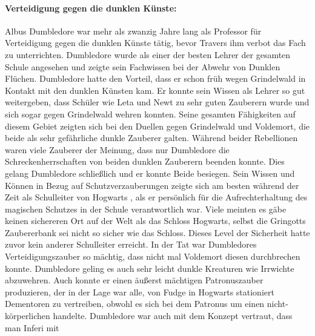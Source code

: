 \documentclass[a4paper, 10pt]{article}
\begin{document}
\paragraph{Verteidigung gegen die dunklen Künste:}
Albus Dumbledore war mehr als zwanzig Jahre lang als Professor für Verteidigung gegen die dunklen Künste tätig, bevor Travers ihm verbot das Fach zu unterrichten. Dumbledore wurde als einer der besten Lehrer der gesamten Schule angesehen und zeigte sein Fachwissen bei der Abwehr von Dunklen Flüchen. Dumbledore hatte den Vorteil, dass er schon früh wegen Grindelwald in Kontakt mit den dunklen Künsten kam. Er konnte sein Wissen als Lehrer so gut weitergeben, dass Schüler wie Leta und Newt zu sehr guten Zauberern wurde und sich sogar gegen Grindelwald wehren konnten. Seine gesamten Fähigkeiten auf diesem Gebiet zeigten sich bei den Duellen gegen Grindelwald und Voldemort, die beide als sehr gefährliche dunkle Zauberer galten. Während beider Rebellionen waren viele Zauberer der Meinung, dass nur Dumbledore die Schreckenherrschaften von beiden dunklen Zauberern beenden konnte. Dies gelang Dumbledore schließlich und er konnte Beide besiegen. Sein Wissen und Können in Bezug auf Schutzverzauberungen zeigte sich am besten während der Zeit als Schulleiter von Hogwarts , als er persönlich für die Aufrechterhaltung des magischen Schutzes in der Schule verantwortlich war. Viele meinten es gäbe keinen sichereren Ort auf der Welt als das Schloss Hogwarts, selbst die Gringotts Zaubererbank sei nicht so sicher wie das Schloss. Dieses Level der Sicherheit hatte zuvor kein anderer Schulleiter erreicht. In der Tat war Dumbledores Verteidigungszauber so mächtig, dass nicht mal Voldemort diesen durchbrechen konnte. Dumbledore geling es auch sehr leicht dunkle Kreaturen wie Irrwichte abzuwehren. Auch konnte er einen äußerst mächtigen Patronuszauber produzieren, der in der Lage war alle, von Fudge in Hogwarts stationiert Dementoren zu vertreiben, obwohl es sich bei dem Patronus um einen nicht-körperlichen handelte. Dumbledore war auch mit dem Konzept vertraut, dass man Inferi mit
\end{document}
